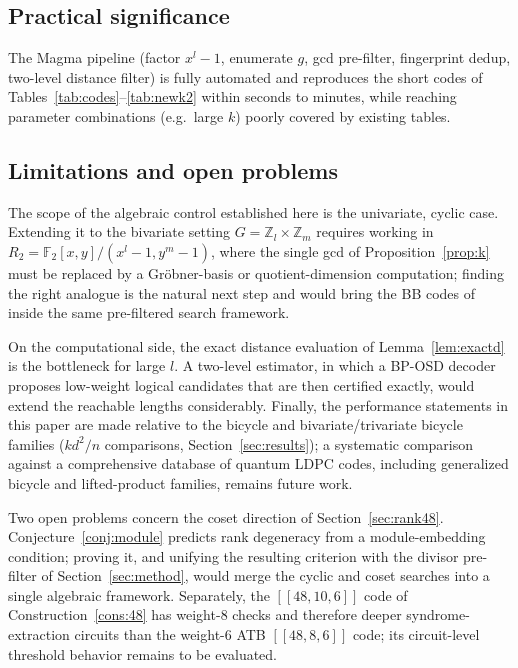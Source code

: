\documentclass[journal,onecolumn]{IEEEtran}
\theoremstyle{definition}
\theoremstyle{remark}
\newcommand{\F}{\mathbb{F}}
\newcommand{\Z}{\mathbb{Z}}
\begin{document}
\subsection{Practical significance}
The Magma pipeline (factor $x^l-1$, enumerate $g$, gcd pre-filter,
fingerprint dedup, two-level distance filter) is fully automated
and reproduces the short codes of Tables~\ref{tab:codes}--\ref{tab:newk2}
within seconds to minutes, while reaching
parameter combinations (e.g.\ large $k$) poorly covered by existing tables.

\subsection{Limitations and open problems}
The scope of the algebraic control established here is the univariate,
cyclic case. Extending it to the bivariate setting
$G=\Z_l\times\Z_m$ requires working in
$R_2=\F_2[x,y]/(x^l-1,y^m-1)$, where the single gcd of
Proposition~\ref{prop:k} must be replaced by a Gr\"obner-basis or
quotient-dimension computation; finding the right analogue is the natural
next step and would bring the BB codes of \cite{BB24} inside the same
pre-filtered search framework.

On the computational side, the exact distance evaluation of
Lemma~\ref{lem:exactd} is the bottleneck for large $l$. A two-level
estimator, in which a BP-OSD decoder proposes low-weight logical
candidates that are then certified exactly, would extend the reachable
lengths considerably. Finally, the performance statements in this paper
are made relative to the bicycle and bivariate/trivariate bicycle families
($kd^2/n$ comparisons, Section~\ref{sec:results}); a systematic comparison
against a comprehensive database of quantum LDPC codes, including
generalized bicycle and lifted-product families, remains future work.

Two open problems concern the coset direction of
Section~\ref{sec:rank48}. Conjecture~\ref{conj:module} predicts rank
degeneracy from a module-embedding condition; proving it, and unifying the
resulting criterion with the divisor pre-filter of
Section~\ref{sec:method}, would merge the cyclic and coset searches into a
single algebraic framework. Separately, the $[[48,10,6]]$ code of
Construction~\ref{cons:48} has weight-$8$ checks and therefore deeper
syndrome-extraction circuits than the weight-$6$ ATB $[[48,8,6]]$ code;
its circuit-level threshold behavior remains to be evaluated.

\end{document}
